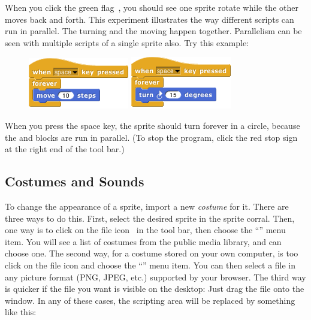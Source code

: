 \documentclass{report}
\begin{document}
When you click the green flag~, you should see one sprite rotate while the other moves back and forth. This experiment illustrates the way different scripts can run in parallel. The turning and the moving happen together. Parallelism can be seen with multiple scripts of a single sprite also. Try this example:\nopagebreak

\begin{figure}[H]
\begin{minipage}{0.5\textwidth}
\centering
\includegraphics[scale=\defaultGraphicsScale]{sprites-and-parallelism-3}
\end{minipage}%
\begin{minipage}{0.5\textwidth}
\centering
\includegraphics[scale=\defaultGraphicsScale]{sprites-and-parallelism-4}
\end{minipage}
\end{figure}

When you press the space key, the sprite should turn forever in a circle, because the  and  blocks are run in parallel. (To stop the program, click the red stop sign~ at the right end of the tool bar.)

\subsection{Costumes and Sounds}

To change the appearance of a sprite, import a new \emph{costume} for it. There are three ways to do this. First, select the desired sprite in the sprite corral. Then, one way is to click on the file icon~ in the tool bar, then choose the ``'' menu item. You will see a list of costumes from the public media library, and can choose one. The second way, for a costume stored on your own computer, is too click on the file icon and choose the ``'' menu item. You can then select a file in any picture format (PNG, JPEG, etc.) supported by your browser. The third way is quicker if the file you want is visible on the desktop: Just drag the file onto the \Snap{} window. In any of these cases, the scripting area will be replaced by something like this:\nopagebreak
\end{document}
